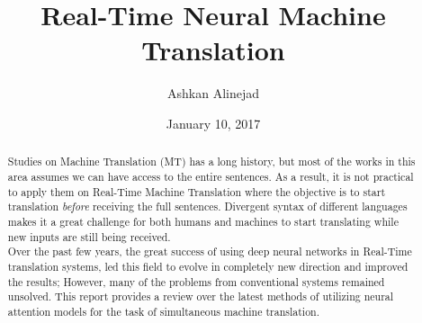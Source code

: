 \documentclass{sfuthesis}
\title{Real-Time Neural Machine Translation}
\author{Ashkan Alinejad}
\date{January 10, 2017}
\begin{document}
\frontmatter
\maketitle{}


\begin{abstract}
	Studies on Machine Translation (MT) has a long history, but most of the works in this area assumes we can have access to the entire sentences. As a result, it is not practical to apply them on Real-Time Machine Translation where the objective is to start translation \textit{before} receiving the full sentences. Divergent syntax of different languages makes it a great challenge for both humans and machines to start translating while new inputs are still being received.\\
	Over the past few years, the great success of using deep neural networks in Real-Time translation systems, led this field to evolve in completely new direction and improved the results; However, many of the problems from conventional systems remained unsolved. This report provides a review over the latest methods of utilizing neural attention models for the task of simultaneous machine translation.
	
\end{abstract}





%
\tableofcontents%
\clearpage

%
\listoftables%
\clearpage

%
\listoffigures%
\clearpage





%
%

\mainmatter%

\end{document}
